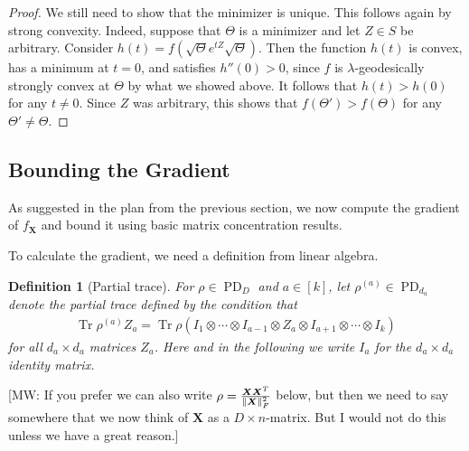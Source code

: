 \documentclass{article}
\newtheorem{definition}{Definition}
\DeclarePairedDelimiter{\norm}{\lVert}{\rVert}
\newcommand{\ot}{\otimes}
\renewcommand{\vec}{\bm}
\newcommand\PD{\operatorname{PD}}
\newcommand\tr{\operatorname{Tr}}
\newcommand{\MW}[1]{{\color{red}[MW: #1]}}
\begin{document}
\begin{proof}
We still need to show that the minimizer is unique.
This follows again by strong convexity.
Indeed, suppose that $\Theta$ is a minimizer and let $Z\in S$ be arbitrary.
Consider $h(t) = f(\sqrt\Theta e^{tZ} \sqrt\Theta)$.
Then the function $h(t)$ is convex, has a minimum at $t=0$, and satisfies $h''(0) > 0$, since $f$ is $\lambda$-geodesically strongly convex at $\Theta$ by what we showed above.
It follows that $h(t) > h(0)$ for any $t\neq0$.
Since $Z$ was arbitrary, this shows that $f(\Theta') > f(\Theta)$ for any $\Theta'\neq\Theta$.
\end{proof}

\subsection{Bounding the Gradient}
As suggested in the plan from the previous section, we now compute the gradient of $f_{\vec X}$ and bound it using basic matrix concentration results.

To calculate the gradient, we need a definition from linear algebra.

\begin{definition}[Partial trace]
For $\rho \in \PD_D$ and $a\in[k]$, let $\rho^{(a)} \in \PD_{d_a}$ denote the \emph{partial trace} defined by the condition that
\begin{align*}
  \tr \rho^{(a)} Z_a = \tr \rho (I_1 \ot \cdots \ot I_{a-1} \ot Z_a \ot I_{a+1} \ot \cdots \ot I_k)
\end{align*}
for all $d_a \times d_a$ matrices $Z_a$.
Here and in the following we write $I_a$ for the $d_a\times d_a$ identity matrix.
\end{definition}

\MW{If you prefer we can also write $\rho = \frac{\vec X \vec X^T}{\norm{\vec X}_F^2}$ below, but then we need to say somewhere that we now think of $\vec X$ as a $D\times n$-matrix. But I would not do this unless we have a great reason.}
\end{document}
